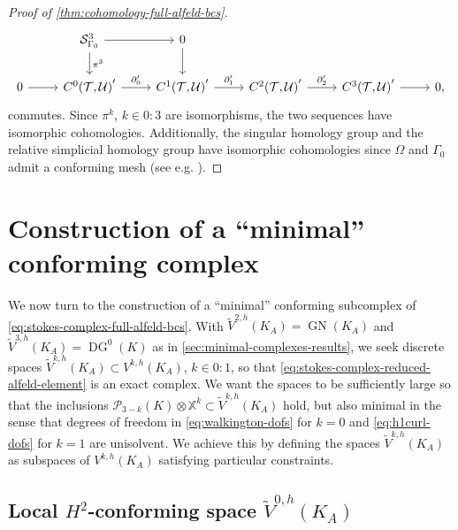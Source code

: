 \documentclass{mcom-l}
\theoremstyle{definition}
\theoremstyle{remark}
\numberwithin{equation}{section}
\newcommand{\dual}[1]{{#1}'}
\DeclareMathOperator{\GN}{GN}
\DeclareMathOperator{\DG}{DG}
\newcommand{\mesh}[0]{\mathcal{T}}
\newcommand{\boundarymesh}[0]{\mathcal{U}}
\begin{document}
\begin{proof}[Proof of \cref{thm:cohomology-full-alfeld-bcs}]
\begin{equation*}
\begin{tikzcd}[ampersand replacement=\&]
			\& \mathcal{S}_{\Gamma_0}^3 \arrow[r] \arrow[d, "\pi^3"]
			\& 0 \arrow[d] \\
			0 \arrow[r] 
			\& \dual{C^0(\mesh, \boundarymesh)} \arrow[r, "\dual{\partial}_0"] 
			\& \dual{C^1(\mesh, \boundarymesh)} \arrow[r, "\dual{\partial}_1"] 
			\& \dual{C^2(\mesh, \boundarymesh)} \arrow[r, "\dual{\partial}_2"]
			\& \dual{C^3(\mesh, \boundarymesh)} \arrow[r]
			\& 0,
		\end{tikzcd}
	\end{equation*}
	commutes. Since $\pi^k$, $k \in 0:3$ are isomorphisms, the two 
	sequences have isomorphic cohomologies. Additionally, the 
	singular homology group and the relative simplicial homology group 
	have isomorphic cohomologies since $\Omega$ and $\Gamma_0$ admit a
	conforming mesh 
	(see e.g. \cite[Chapter 4, Section 6, Theorem 8]{Spanier95}).
\end{proof}


\section{Construction of a ``minimal'' conforming complex}
\label{sec:gn-complex-construction}

We now turn to the construction of a ``minimal'' conforming 
subcomplex of \cref{eq:stokes-complex-full-alfeld-bcs}. With 
$\tilde{V}^{2, h}(K_A) = \GN(K_A)$ and $\tilde{V}^{3, h}(K_A) = \DG^0(K)$
as in \cref{sec:minimal-complexes-results},
we seek discrete spaces $\tilde{V}^{k, h}(K_A) \subset V^{k, h}(K_A)$, 
$k \in 0:1$, so that 
\cref{eq:stokes-complex-reduced-alfeld-element} is an exact complex.
We want the spaces to be sufficiently large so that the inclusions 
$\mathcal{P}_{3-k}(K) \otimes \mathbb{X}^k \subset \tilde{V}^{k, h}(K_A)$ hold, 
but also minimal in the sense that 
degrees of freedom in \cref{eq:walkington-dofs} for $k=0$ and 
\cref{eq:h1curl-dofs} for $k=1$ are unisolvent. We achieve this by defining 
the spaces $\tilde{V}^{k, h}(K_A)$ as subspaces of $V^{k, h}(K_A)$ satisfying
particular constraints.

\subsection{Local $H^2$-conforming space $\tilde{V}^{0, h}(K_A)$}
\end{document}

